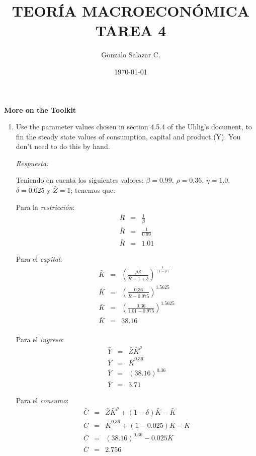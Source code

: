 \documentclass[11pt]{amsart}
\title{TEOR\'IA MACROECON\'OMICA \\ TAREA 4}
\author{Gonzalo Salazar C.}
\date{\today} %
\begin{document}


\maketitle

\bigskip
{\LARGE \textbf{More on the Toolkit}}
\renewcommand{\labelenumi}{\arabic{enumi}.}

\medskip
\begin{enumerate}
\item{Use the parameter values chosen in section 4.5.4 of the Uhlig's document, to fin the steady state values of consumption, capital and product (Y). You don't need to do this by hand.}

\medskip
\emph{Respuesta:}

Teniendo en cuenta los siguientes valores: $\beta=0.99$, $\rho=0.36$, $\eta=1.0$, $\delta=0.025$ y $\bar Z=1$; tenemos que:

\medskip
Para la \emph{restricci\'on}:
\begin{eqnarray*}
\bar R & = & \frac{1}{\beta} \\
\bar R & = & \frac{1}{0.99} \\
\bar R & = & 1.01
\end{eqnarray*}

\medskip
Para el \emph{capital}:
\begin{eqnarray*}
\bar K & = & (\frac{\rho\bar Z}{\bar R-1+\delta})^{\frac{1}{(1-\rho)}} \\
\bar K & = & (\frac{0.36}{\bar R-0.975})^{1.5625} \\
\bar K & = & (\frac{0.36}{1.01-0.975})^{1.5625} \\
\bar K & = & 38.16 \\
\end{eqnarray*}

\medskip
Para el \emph{ingreso}:
\begin{eqnarray*}
\bar Y & = & \bar Z \bar K^{\rho} \\
\bar Y & = & \bar K^{0.36} \\
\bar Y & = & (38.16)^{0.36} \\
\bar Y & = & 3.71
\end{eqnarray*}

\medskip
Para el \emph{consumo}:
\begin{eqnarray*}
\bar C & = & \bar Z \bar K^{\rho}+(1-\delta)\bar K-\bar K \\
\bar C & = & \bar K^{0.36}+(1-0.025)\bar K - \bar K \\
\bar C & = & (38.16)^{0.36}-0.025\bar K \\
\bar C & = & 2.756
\end{eqnarray*}


\end{enumerate}
\end{document}
